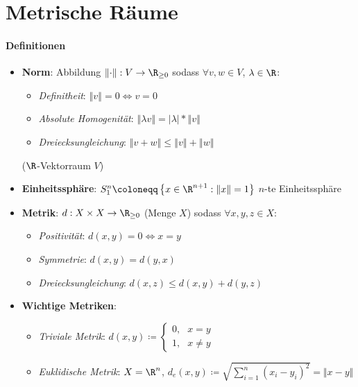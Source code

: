 \section{Metrische Räume}

\paragraph{Definitionen}
\begin{itemize}
  \item \textbf{Norm}: Abbildung \( \left\Vert \cdot \right\Vert: V \to \R_{\geq 0} \) sodass \( \forall v,w \in V \), \( \lambda \in \R \):
  \begin{itemize}
    \item \emph{Definitheit}: \( \left\Vert v \right\Vert = 0 \Leftrightarrow v = 0 \)
    \item \emph{Absolute Homogenität}: \( \left\Vert \lambda v \right\Vert = \left\vert \lambda \right\vert * \left\Vert v \right\Vert \)
    \item \emph{Dreiecksungleichung}: \( \left\Vert v + w \right\Vert \leq \left\Vert v \right\Vert + \left\Vert w \right\Vert \)
  \end{itemize}
  (\( \R \)-Vektorraum \( V \))
  \item \textbf{Einheitssphäre}: \( S_1^n \coloneqq \left \{ x \in \R^{n+1} : \left\Vert x \right\Vert = 1 \right \} \) \( n \)-te Einheitssphäre
  \item \textbf{Metrik}: \( d: X \times X \to \R_{\geq 0} \) (Menge \( X \)) sodass \( \forall x,y,z \in X: \)
  \begin{itemize}
    \item \emph{Positivität}: \( d(x,y) = 0 \Leftrightarrow x = y \)
    \item \emph{Symmetrie}: \( d(x,y) = d(y,x) \)
    \item \emph{Dreiecksungleichung}: \( d(x,z) \leq d(x,y) + d(y,z) \)
  \end{itemize}
  \item \textbf{Wichtige Metriken}:
  \begin{itemize}
    \item \emph{Triviale Metrik}: \( d(x,y) \coloneqq \begin{cases}
      0\text{,} &x=y \\ 1\text{,} &x \neq y
    \end{cases} \)
    \item \emph{Euklidische Metrik}: \( X = \R^n \), \( d_e(x, y) \coloneqq \sqrt{\sum_{i=1}^n(x_i-y_i)^2} = \Vert x-y \Vert \)

\end{itemize}
\end{itemize}
